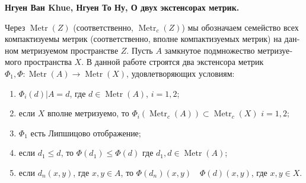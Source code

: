 \documentclass[11pt,a4paper,leqno,twoside]{article}
\newcommand{\Metr}{\operatorname{Metr}}
\newcommand{\restr}{\vert}
\begin{document}
\newpage %
\begin{otherlanguage}{russian}
\noindent\textbf{Нгуен Ван \foreignlanguage{english}{Khue}, Нгуен То Ну, О двух экстенсорах метрик.}

Через $\Metr(Z)$ (соответственно, $\Metr_c(Z)$) мы обозначаем семейство всех компактизуемы метрик (соответственно, вполне компактизуемых метрик) на данном метризуемом пространстве $Z$. Пусть $A$ замкнутое подмножество метризуемого пространства $X$. В данной работе строятся два экстенсора метрик $\Phi_1,\Phi:\Metr(A)\to\Metr(X)$, удовлетворяющих условиям:
\begin{enumerate}[label=(\roman*),leftmargin=3.5em,itemsep=3pt,topsep=4pt]
\item $\Phi_i(d)\restr A=d$, где $d\in\Metr(A)$, $i=1,2$;
\item если $X$ вполне метризуемо, то $\Phi_i(\Metr_c(A))\subset\Metr_c(X)$ $i=1,2$;
\item $\Phi_1$ есть Липшицово отображение;
\item если $d_1\leq d$, то $\Phi(d_1)\leq\Phi(d)$ где $d_1,d\in\Metr(A)$;
\item если $d_n(x,y)$, где $x,y\in A$, то $\Phi(d_n)(x,y)\quad\Phi(d)(x,y)$, где $x,y\in X$.
\end{enumerate}
\end{otherlanguage}
\end{document}
